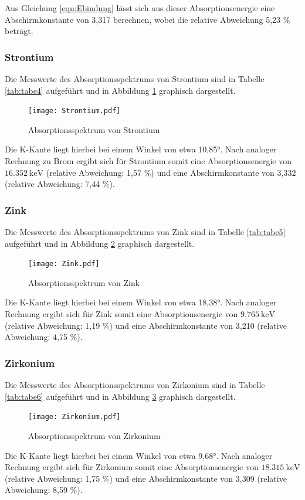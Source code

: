 Aus Gleichung \ref{eqn:Ebindung} lässt sich aus dieser Absorptionsenergie eine Abschirmkonstante
von 3,317 berechnen, wobei die relative Abweichung 5,23 \% beträgt.

\subsubsection{Strontium}
Die Messwerte des Absorptionsspektrums von Strontium sind in Tabelle \ref{tab:tabe4} aufgeführt und
in Abbildung \ref{fig:Strontium} graphisch dargestellt.
\begin{figure}[H]
  \centering
  \texttt{[image: Strontium.pdf]}
  \caption{Absorptionsspektrum von Strontium}
  \label{fig:Strontium}
\end{figure}
Die K-Kante liegt hierbei bei einem Winkel von etwa 10,85°. Nach analoger Rechnung zu Brom
ergibt sich für Strontium somit eine Absorptionsenergie von $\SI{16.352}{\kilo\electronvolt}$
(relative Abweichung: 1,57 \%) und eine Abschirmkonstante von 3,332 (relative Abweichung: 7,44 \%).

\subsubsection{Zink}
Die Messwerte des Absorptionsspektrums von Zink sind in Tabelle \ref{tab:tabe5} aufgeführt und
in Abbildung \ref{fig:Zink} graphisch dargestellt.
\begin{figure}[H]
  \centering
  \texttt{[image: Zink.pdf]}
  \caption{Absorptionsspektrum von Zink}
  \label{fig:Zink}
\end{figure}
Die K-Kante liegt hierbei bei einem Winkel von etwa 18,38°. Nach analoger Rechnung
ergibt sich für Zink somit eine Absorptionsenergie von $\SI{9.765}{\kilo\electronvolt}$
(relative Abweichung: 1,19 \%) und eine Abschirmkonstante von 3,210 (relative Abweichung: 4,75 \%).

\subsubsection{Zirkonium}
Die Messwerte des Absorptionsspektrums von Zirkonium sind in Tabelle \ref{tab:tabe6} aufgeführt und
in Abbildung \ref{fig:Zirkonium} graphisch dargestellt.
\begin{figure}[H]
  \centering
  \texttt{[image: Zirkonium.pdf]}
  \caption{Absorptionsspektrum von Zirkonium}
  \label{fig:Zirkonium}
\end{figure}
Die K-Kante liegt hierbei bei einem Winkel von etwa 9,68°. Nach analoger Rechnung
ergibt sich für Zirkonium somit eine Absorptionsenergie von $\SI{18.315}{\kilo\electronvolt}$
(relative Abweichung: 1,75 \%) und eine Abschirmkonstante von 3,309 (relative Abweichung: 8,59 \%).
